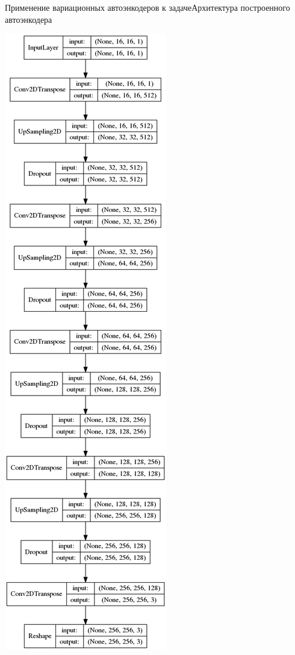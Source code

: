 \documentclass{beamer}
\begin{document}
\begin{frame}{Применение вариационных автоэнкодеров к задаче}{Архитектура построенного автоэнкодера}
\begin{minipage}{0.1\textwidth}
\begin{flushleft}
\end{flushleft}
\end{minipage}
\hfill
\begin{minipage}{0.1\textwidth}
\begin{center}
\includegraphics[scale=0.12]{decoder}

\end{center}
\end{minipage}
\end{frame}
\end{document}
